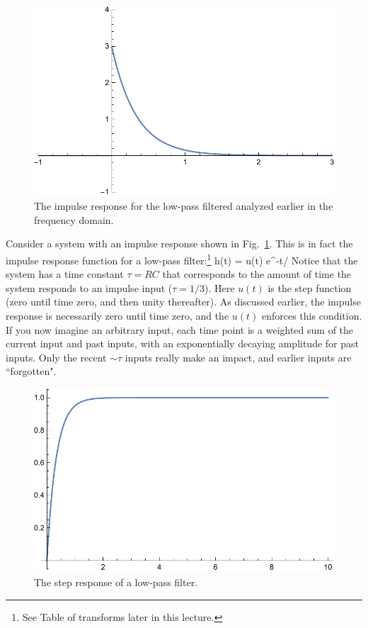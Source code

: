 \begin{figure}[tb]
\begin{center}
\includegraphics[width=.6\columnwidth]{impulse_resp}
\end{center}
\caption{The impulse response for the low-pass filtered analyzed earlier in the frequency domain. } \label{fig:impulse_resp}
\end{figure}


Consider a system with an impulse response shown in Fig.~\ref{fig:impulse_resp}.  This is in fact the impulse response function for a low-pass filter:\footnote{See Table of transforms later in this lecture.}
\be
	h(t) = u(t)  e^{-t/\tau}
\ee
Notice that the system has a time constant $\tau = RC$ that corresponds to the amount of time the system responds to an impulse input ($\tau = 1/3$).  Here $u(t)$ is the step function (zero until time zero, and then unity thereafter).  As discussed earlier, the impulse response is necessarily zero until time zero, and the $u(t)$ enforces this condition.  If you now imagine an arbitrary input, each time point is a weighted sum of the current input and past inputs, with an exponentially decaying amplitude for past inputs.  Only the recent $\sim \tau$ inputs really make an impact, and earlier inputs are ``forgotten".  
 


%


\begin{figure}[tb]
\begin{center}
\includegraphics[width=.5\columnwidth]{step_resp}
\end{center}
\caption{The step response of a low-pass filter. } \label{fig:step_resp}
\end{figure}



